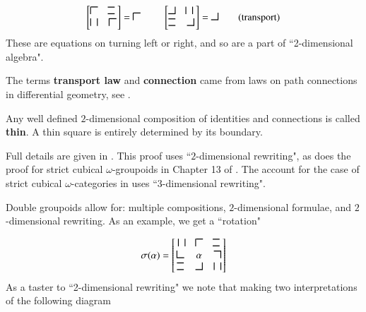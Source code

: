 \documentclass{elsarticle}
\newcommand{\bl}{\mbox{\rule{0.08em}{1.7ex}\hspace{-0.00em}\rule{0.7em}{0.2ex}}}
\newcommand{\br}{\mbox{\rule{0.7em}{0.2ex}\hspace{-0.04em}\rule{0.08em}{1.7ex}}}
\newcommand{\tr}{\mbox{\rule[1.5ex]{0.7em}{0.2ex}\hspace{-0.03em}\rule{0.08em}{1.7ex}}}
\newcommand{\tl}{\mbox{\rule{0.08em}{1.7ex}\rule[1.54ex]{0.7em}{0.2ex}}}
\newcommand{\hh}{\mbox{\rule{0.7em}{0.2ex}\hspace{-0.7em}\rule[1.5ex]{0.70em}{0.2ex}}}
\newcommand{\vv}{\mbox{\rule{0.08em}{1.7ex}\hspace{0.6em}\rule{0.08em}{1.7ex}}}
\begin{document}
\begin{equation}
\begin{bmatrix}\tl & \hh \;\\ \vv & \tl
\end{bmatrix} = \tl\;\qquad
\begin{bmatrix}\br & \vv \;\\ \hh & \br  \end{bmatrix} = \br
 \tag{transport}
\end{equation}
 These are equations on turning left or right, and so
 {are a part of ``2-dimensional algebra". }


 The terms {\bf transport law} and  {\bf connection}
came from laws on path connections in differential geometry, see \cite{BS76}.

Any well defined $2$-dimensional composition of identities and connections  is called {\bf thin}. A thin square is entirely determined by its boundary.



Full details are given in \cite[Section 6.7]{BHS}.  This proof uses ``$2$-dimensional rewriting", as does the proof for strict cubical $\omega$-groupoids in Chapter 13 of \cite{BHS}. The account for the case of strict cubical  $\omega$-categories in \cite{higgins-thin} uses ``$3$-dimensional rewriting".



 Double groupoids allow for: multiple compositions, $2$-dimensional formulae,  and $2$-dimensional  rewriting.
As an example, we   get a ``rotation"

$$\sigma (\alpha)= \begin{bmatrix}
 \;  \vv & \tl & \hh\;  \\
  \bl & \alpha & \tr \\
  \hh & \br & \vv
\end{bmatrix}$$
As a taster to ``2-dimensional rewriting" we note that making two interpretations of the following diagram
\end{document}
